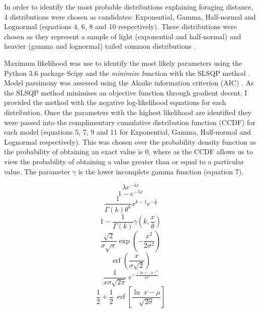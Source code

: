 \documentclass[11pt,usenames,dvipsnames,a4paper]{article}
\DeclareMathOperator\erf{erf}
\begin{document}
\begin{linenumbers}
\hspace{\parindent}
In order to identify the most probable distributions explaining foraging distance, 4 distributions were chosen as candidates: Exponential, Gamma, Half-normal and Lognormal (equations 4, 6, 8 and 10 respectively). These distributions were chosen as they represent a sample of light (exponential and half-normal) and heavier (gamma and lognormal) tailed common distributions \citep{Frank2009}.

Maximum likelihood was use to identify the most likely parameters using the Python 3.6 \citep{python} package Scipy and the \textit{minimize} \citep{Jones2001} function with the SLSQP method \citep{Kraft1988}. Model parsimony was assessed using the Akaike information criterion (AIC) \citep{Burnham2004}. As the SLSQP method minimises an objective function through gradient decent, I provided the method with the negative log-likelihood equations for each distribution. Once the parameters with the highest likelihood are identified they were passed into the complimentary cumulative distribution function (CCDF) for each model (equations 5, 7, 9 and 11 for Exponential, Gamma, Half-normal and Lognormal respectively). This was chosen over the probability density function as the probability of obtaining an exact value is 0, where as the CCDF allows us to view the probability of obtaining a value greater than or equal to a particular value. The parameter $\gamma$ is the lower incomplete gamma function (equation 7).
\end{linenumbers}

\begin{equation}
\lambda e^{-\lambda x}
\end{equation}
\begin{equation}
1 - e^{-\lambda x}
\end{equation}
\begin{equation}
\frac{1}{\Gamma(k)\theta^k}x^{k-1}e^{-\frac{x}{\theta}}
\end{equation}
\begin{equation}
1 - \frac{1}{\Gamma(k)}\gamma(k,\frac{x}{\theta})
\end{equation}
\begin{equation}
\frac{\sqrt{2}}{\sigma \sqrt{\pi}} \exp \left(-\frac{x^2}{2 \sigma^2}\right)
\end{equation}
\begin{equation}
\erf\left(\frac{x}{\sigma \sqrt{2}}\right)
\end{equation}
\begin{equation}
\frac{1}{x \sigma \sqrt{2 \pi}}\ e^{- \frac{(\ln\ x - \mu)^2}{2\sigma^2}}
\end{equation}
\begin{equation}
\frac{1}{2} + \frac{1}{2}\ \erf\left[\frac{\ln\ x - \mu}{\sqrt{2 \sigma}}\right]
\end{equation}
\end{document}

